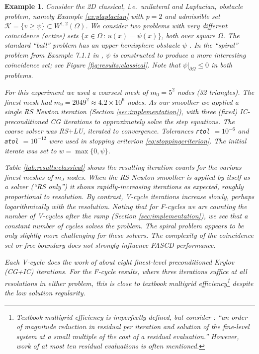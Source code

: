 \documentclass[letterpaper,final,12pt,reqno]{amsart}
\theoremstyle{cstyle}
\theoremstyle{cstyle*}
\theoremstyle{dstyle}
\newtheorem{example}[theorem]{Example}
\numberwithin{equation}{section}
\numberwithin{figure}{section}
\numberwithin{table}{section}
\numberwithin{theorem}{section}
\begin{document}
\begin{example} \label{ex:results:classical}
Consider the 2D classical, i.e.~unilateral and Laplacian, obstacle problem, namely Example \ref{ex:plaplacian} with $p=2$ and admissible set $\mathcal{K} = \{v \ge \psi\} \subset W^{1,2}(\Omega)$.  We consider two problems with very different coincidence (active) sets $\{x\in\Omega \,:\, u(x)=\psi(x)\}$, both over square $\Omega$.   The standard ``ball'' problem has an upper hemisphere obstacle $\psi$ \cite[Chapter 12]{Bueler2021}.  In the ``spiral'' problem from Example 7.1.1 in \cite{GraeserKornhuber2009}, $\psi$ is constructed to produce a more interesting coincidence set; see Figure \ref{fig:results:classical}.  Note that $\psi\big|_{\partial \Omega} \le 0$ in both problems.

For this experiment we used a coarsest mesh of $m_0=5^2$ nodes (32 triangles).  The finest mesh had $m_9=2049^2 \approx 4.2 \times 10^{6}$ nodes.  As our smoother we applied a single RS Newton iteration (Section \ref{sec:implementation}), with three (fixed) IC-preconditioned CG iterations to approximately solve the step equations.  The coarse solver was RS$+$LU, iterated to convergence.  Tolerances \texttt{rtol} $= 10^{-6}$ and \texttt{atol} $= 10^{-12}$ were used in stopping criterion \eqref{eq:stoppingcriterion}.  The initial iterate was set to $w=\max\{0,\psi\}$.

Table \ref{tab:results:classical} shows the resulting iteration counts for the various finest meshes of $m_J$ nodes.  When the RS Newton smoother is applied by itself as a solver (``RS only'') it shows rapidly-increasing iterations as expected, roughly proportional to resolution.  By contrast, V-cycle iterations increase slowly, perhaps logarithmically with the resolution.  Noting that for F-cycles we are counting the number of V-cycles after the ramp (Section \ref{sec:implementation}), we see that a constant number of cycles solves the problem.  The spiral problem appears to be only slightly more challenging for these solvers.  The complexity of the coincidence set or free boundary does not strongly-influence FASCD performance.

Each V-cycle does the work of about eight finest-level preconditioned Krylov (CG+IC) iterations.  For the F-cycle results, where three iterations suffice at all resolutions in either problem, this is close to textbook multigrid efficiency\footnote{Textbook multigrid efficiency is imperfectly defined, but consider \cite{BrownSmithAhmadia2013}: ``an order of magnitude reduction in residual per iteration and solution of the fine-level system at a small multiple of the cost of a residual evaluation.''  However, work of at most ten residual evaluations is often mentioned.} despite the low solution regularity.
\end{example}
\end{document}
